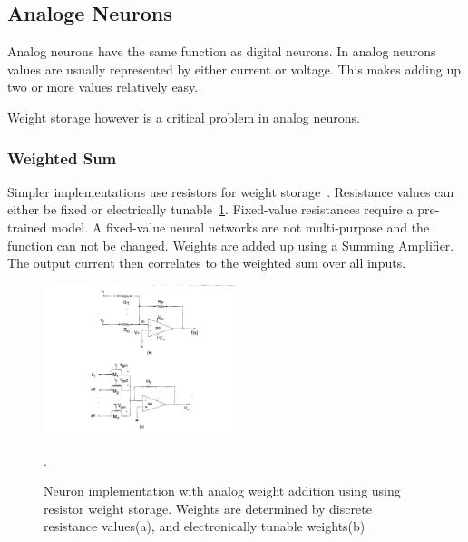 \documentclass[conference]{IEEEtran}
\begin{document}



    \subsection{Analoge Neurons}

    Analog neurons have the same function as digital neurons.
    In analog neurons values are usually represented by either current or voltage.
    This makes adding up two or more values relatively easy.

    Weight storage however is a critical problem in analog neurons.

    \subsubsection{Weighted Sum}

    Simpler implementations use resistors for weight storage~\cite{zurada1992analog}.
    Resistance values can either be fixed or electrically tunable~\ref{fig:analogweights}.
    Fixed-value resistances require a pre-trained model.
    A fixed-value neural networks are not multi-purpose and the function can not be changed.
    Weights are added up using a Summing Amplifier.
    The output current then correlates to the weighted sum over all inputs.

    \begin{figure}[h]
        \centering
        \includegraphics[width=0.5\textwidth]{resources/analog-weights.png}
        \caption{Neuron implementation with analog weight addition using using resistor weight storage.
        Weights are determined by discrete resistance values(a), and electronically tunable weights(b)~\cite[Fig.~1]{zurada1992analog}}.
        \label{fig:analogweights}
    \end{figure}
\end{document}
